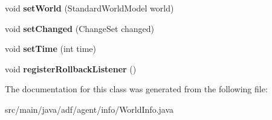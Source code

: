 \begin{DoxyCompactItemize}
$$void {\bfseries set\+World} (Standard\+World\+Model world)
\item 
\hypertarget{classadf_1_1agent_1_1info_1_1WorldInfo_af196b26e724b0cc6743aaf7f05ff106b}{}\label{classadf_1_1agent_1_1info_1_1WorldInfo_af196b26e724b0cc6743aaf7f05ff106b} 
void {\bfseries set\+Changed} (Change\+Set changed)
\item 
\hypertarget{classadf_1_1agent_1_1info_1_1WorldInfo_a76748434bba4146dce4314c21bde11c6}{}\label{classadf_1_1agent_1_1info_1_1WorldInfo_a76748434bba4146dce4314c21bde11c6} 
void {\bfseries set\+Time} (int time)
\item 
\hypertarget{classadf_1_1agent_1_1info_1_1WorldInfo_adb9593963c7a5643f94a576fda1c4a85}{}\label{classadf_1_1agent_1_1info_1_1WorldInfo_adb9593963c7a5643f94a576fda1c4a85} 
void {\bfseries register\+Rollback\+Listener} ()
\end{DoxyCompactItemize}


The documentation for this class was generated from the following file\+:\begin{DoxyCompactItemize}
\item 
src/main/java/adf/agent/info/World\+Info.\+java\end{DoxyCompactItemize}
